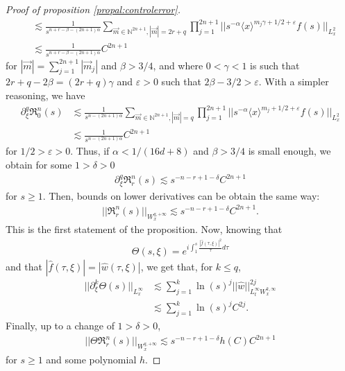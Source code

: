 \documentclass[a4paper, 15pt]{article}
\numberwithin{equation}{section}
\begin{document}
\begin{proof}[Proof of proposition \ref{propal:controlerror}]
\begin{align*}
    &\lesssim \frac{1}{s^{n+r-\beta-(2n+1)\alpha}}\sum_{\overrightarrow{m}\in\mathbb{N}^{2n+1}, |\overrightarrow{m}|=2r+q}\prod^{2n+1}_{j=1}||s^{-\alpha}\langle x\rangle^{m_j\gamma+1/2+\varepsilon} f(s)||_{L^2_x} \\
    &\lesssim \frac{1}{s^{n+r-\beta-(2n+1)\alpha}}C^{2n+1}
\end{align*}
for $|\overrightarrow{m}|=\sum_{j=1}^{2n+1}|\overrightarrow{m}_j|$ and $\beta>3/4$, and where $0<\gamma<1$ is such that $2r+q-2\beta=(2r+q)\gamma$ and $\varepsilon>0$ such that $2\beta-3/2>\varepsilon$. With a simpler reasoning, we have 
\begin{align*}
    \partial^q_\xi \mathfrak{R}^n_0(s)
    &\lesssim \frac{1}{s^{n-(2n+1)\alpha}}\sum_{\overrightarrow{m}\in\mathbb{N}^{2n+1}, |\overrightarrow{m}|=q}\prod^{2n+1}_{j=1}||s^{-\alpha}\langle x\rangle^{m_j+1/2+\varepsilon} f(s)||_{L^2_x} \\
    &\lesssim \frac{1}{s^{n-(2n+1)\alpha}}C^{2n+1}
\end{align*}
for $1/2>\varepsilon>0$. Thus, if $\alpha<1/(16d+8)$ and $\beta>3/4$ is small enough, we obtain for some $1>\delta>0$
\begin{align*}
    \partial^q_\xi \mathfrak{R}^n_r(s)\lesssim s^{-n-r+1-\delta}C^{2n+1}
\end{align*}
for $s\geq 1$.
Then, bounds on lower derivatives can be obtain the same way:
\begin{align}
|| \mathfrak{R}^n_r(s)||_{W^{q,+\infty}_x}\lesssim s^{-n-r+1-\delta}C^{2n+1}.
\end{align}
This is the first statement of the proposition. Now, knowing that 
\begin{align*}
    \Theta(s,\xi)=e^{i\int^s_1\frac{|\hat{f}(\tau,\xi)|^2}{\tau}d\tau}
\end{align*}
and that $|\hat{f}(\tau,\xi)|=|\hat{w}(\tau,\xi)|$, we get that, for $k\leq q$,
\begin{align*}
    ||\partial^k_\xi \Theta(s)||_{L^\infty_x}&\lesssim \sum^{k}_{j=1}\ln(s)^j||\hat{w}||^{2j}_{L^\infty_t W^{k,\infty}_x}\\
   & \lesssim \sum^{k}_{j=1}\ln(s)^jC^{2j}.
\end{align*}
Finally, up to a change of $1>\delta>0$, 
\begin{align}
||\Theta\mathfrak{R}^n_r(s)||_{W^{q,+\infty}_x}\lesssim s^{-n-r+1-\delta}h(C)C^{2n+1}
\end{align}
for $s\geq 1$ and some polynomial $h$. 
\end{proof}
\end{document}
